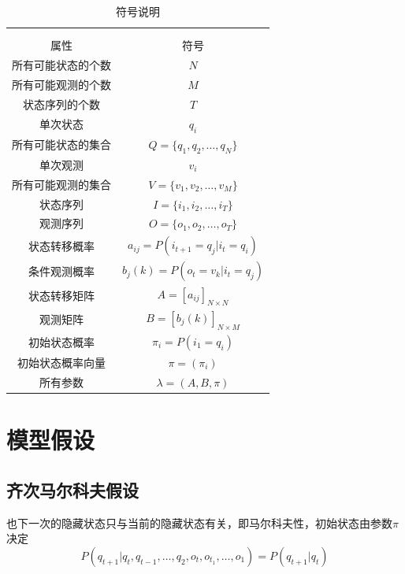 \documentclass[a4paper,12pt]{ctexart}     %
\begin{document}
	
\begin{center}
	{   %
		\begin{longtable}[htbp]{cc}\songti\zihao{5}
			\renewcommand\arraystretch{1.5}         %
			\label{tab:shuoming}\\
			\caption{符号说明 } \\
			\toprule    
			属性 & 符号  \\    
			\midrule 
			所有可能状态的个数 &$ N $ \\
			所有可能观测的个数 & $ M $ \\ 
			状态序列的个数 & $ T $  \\   
			单次状态 & $q_i$ \\ 
			所有可能状态的集合 & $ Q = \{ q_1,q_2,\dots,q_N\} $  \\
			单次观测 & $ v_i $  \\ 
			所有可能观测的集合 & $ V = \{ v_1,v_2,\dots,v_M\} $  \\
			状态序列 & $ I = \{i_1,i_2,\dots,i_T\} $  \\
			观测序列 & $ O = \{ o_1,o_2,\dots,o_T\} $ \\
			状态转移概率 & $ a_{ij} = P(i_{t+1} = q_j | i_t = q_i) $ \\
			条件观测概率 & $ b_j(k) = P(o_t = v_k| i_t = q_j)$ \\ 
			状态转移矩阵 & $ A = [a_{ij} ]_{N \times N} $ \\
			观测矩阵 & $ B = [b_j(k)]_{N \times M} $ \\
			初始状态概率 & $ \pi_i = P(i_1 = q_i)$ \\
			初始状态概率向量 & $ \pi = (\pi_i) $ \\
			所有参数 & $ \lambda = (A,B,\pi) $\\  
			\bottomrule  
			
		\end{longtable} 
	}
\end{center}


	\section{模型假设}
	
	\subsection{齐次马尔科夫假设}
	
	也下一次的隐藏状态只与当前的隐藏状态有关，即马尔科夫性，初始状态由参数$ \pi $决定
	\begin{equation}\label{eq1}
		P(q_{t+1}|q_t,q_{t-1},\dots,q_2,o_t,o_{t_1},\dots,o_1) = P(q_{t+1}|q_t)
	\end{equation}  
	 
\end{document}
